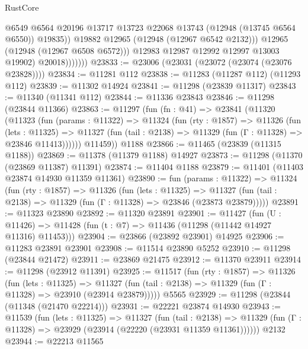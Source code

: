 \begin{lexlean}{RustCore}
\begin{coremodule}
                            @6549
                            @6564
                            @20196
                            @13717
                            @13723
                            @22068
                            @13743
                            (@12948 (@13745 @6564 @6550))
                            @19835))
                        @19882
                        @12965
                        (@12948 (@12967 @6542 @2132)))
                      @12965
                      (@12948 (@12967 @6508 @6572)))
                    @12983
                    @12987
                    @12992
                    @12997
                    @13003
                    @19902)
                  @20018)))))))
@23833 := @23006 (@23031 (@23072 (@23074 (@23076 @23828))))
@23834 := @11281 @112
@23838 := @11283 (@11287 @112) (@11293 @112)
@23839 := @11302 @14924
@23841 := @11298 (@23839 @11317)
@23843 := @11340 (@11341 @112)
@23844 := @11336 @23843
@23846 := @11298 (@23844 @11366)
@23863 := @11297
    (fun (fn : @41) =>
    @23841
      (@11320
        (@11323
          (fun (params : @11322) =>
          @11324
            (fun (rty : @1857) =>
            @11326
              (fun (lets : @11325) =>
              @11327 (fun (tail : @2138) => @11329 (fun (Γ : @11328) => @23846 @11413))))))
        @11459))
    @1188
@23866 := @11465 (@23839 (@11315 @1188))
@23869 := @11378 (@11379 @1188) @14927
@23873 := @11298 (@11370 (@23869 @11387) @11391)
@23874 := @11404 @1188
@23879 := @11401 (@11403 @23874 @14930 @11359 @11361)
@23890 := fun (params : @11322) =>
  @11324
    (fun (rty : @1857) =>
    @11326
      (fun (lets : @11325) =>
      @11327 (fun (tail : @2138) => @11329 (fun (Γ : @11328) => @23846 (@23873 @23879)))))
@23891 := @11323 @23890
@23892 := @11320 @23891
@23901 := @11427
    (fun (U : @11426) => @11428 (fun (t : @7) => @11436 (@11298 (@11442 @14927 @11316) @11453)))
@23904 := @23866 (@23892 @23901) @14925
@23906 := @11283 @23891 @23901
@23908 := @11514 @23890 @5252
@23910 := @11298 (@23844 @21472)
@23911 := @23869 @21475
@23912 := @11370 @23911
@23914 := @11298 (@23912 @11391)
@23925 := @11517
    (fun (rty : @1857) =>
    @11326
      (fun (lets : @11325) =>
      @11327 (fun (tail : @2138) => @11329 (fun (Γ : @11328) => @23910 (@23914 @23879)))))
    @5565
@23929 := @11298 (@23844 (@11348 (@21470 @22214)))
@23931 := @22221 @23874 @14930
@23943 := @11539
    (fun (lets : @11325) =>
    @11327
      (fun (tail : @2138) =>
      @11329 (fun (Γ : @11328) => @23929 (@23914 (@22220 (@23931 @11359 @11361))))))
    @2132
@23944 := @22213 @11565

\end{coremodule}
\end{lexlean}
